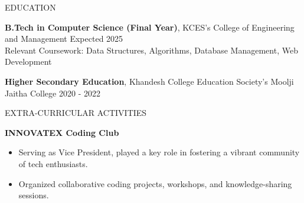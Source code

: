 \documentclass{resume} %
\begin{document}

\begin{rSection}{EDUCATION}

{\bf B.Tech in Computer Science (Final Year)}, KCES's College of Engineering and Management \hfill Expected 2025 \\
Relevant Coursework: Data Structures, Algorithms, Database Management, Web Development

{\bf Higher Secondary Education}, Khandesh College Education Society's Moolji Jaitha College \hfill 2020 - 2022

\end{rSection}


\begin{rSection}{EXTRA-CURRICULAR ACTIVITIES}

\textbf{INNOVATEX Coding Club}
\begin{itemize}
    \item Serving as Vice President, played a key role in fostering a vibrant community of tech enthusiasts.
    \item Organized collaborative coding projects, workshops, and knowledge-sharing sessions.
\end{itemize}

\end{rSection}

\end{document}
